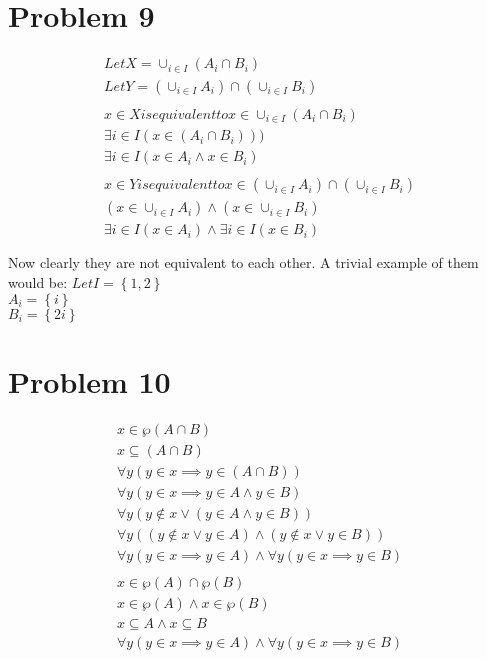 \documentclass{article}
\begin{document}
\section{Problem 9}
\begin{align*}
  Let X = \cup_{i \in I} (A_i \cap B_i) \\
  Let Y = (\cup_{i \in I}A_i) \cap (\cup_{i \in  I} B_i) \\ \\
  x \in X is equivalent to x \in \cup_{i \in I} (A_i \cap B_i) \\
  \exists i \in I(x \in (A_i \cap B_i))) \\
  \exists i \in I(x \in A_i \land x \in B_i) \\ \\
  x \in Y is equivalent to x \in (\cup_{i \in I}A_i) \cap (\cup_{i \in  I} B_i) \\
  (x \in \cup_{i \in I}A_i) \land (x \in \cup_{i \in  I} B_i) \\
  \exists i \in I(x \in A_i) \land \exists i \in I (x \in B_i) \\ \\
\end{align*}
Now clearly they are not equivalent to each other. A trivial example of them would be:
$Let I = \left\{1,2\right\}$ \\
$A_i = \left\{i\right\}$ \\
$B_i = \left\{2i\right\}$ \\

\section{Problem 10}
\begin{align*}
  x \in \wp(A \cap B) \\
  x \subseteq (A \cap B) \\
  \forall y (y \in x \implies y \in (A \cap B)) \\
  \forall y (y \in x \implies y \in A \land y \in B) \\
  \forall y (y \notin x \lor (y \in A \land y \in B)) \\
  \forall y ((y \notin x \lor y \in A) \land (y \notin x \lor y \in B)) \\
  \forall y(y \in x \implies y \in A) \land \forall y(y \in x \implies y \in B) \\ \\
  x \in \wp(A) \cap \wp(B) \\
  x \in \wp(A) \land x \in \wp(B) \\
  x \subseteq A \land x \subseteq B \\
  \forall y(y \in x \implies y \in A) \land \forall y(y \in x \implies y \in B) \\
\end{align*}
\end{document}
